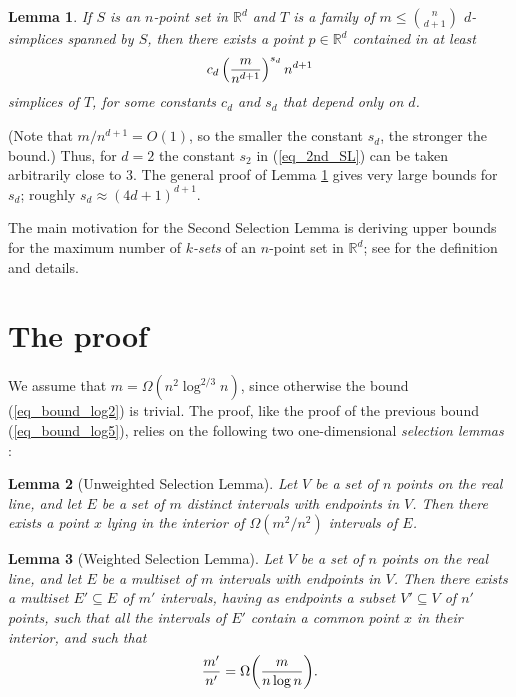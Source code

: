 \documentclass[11pt]{article}
\newtheorem{lemma}{Lemma}
\begin{document}
\begin{lemma}\label{lemma_2nd_sel}
If $S$ is an $n$-point set in $\mathbb R^d$ and $T$ is a family of
$m\le {n \choose d+1}$ $d$-simplices spanned by $S$, then there
exists a point $p\in \mathbb R^d$ contained in at least
\begin{equation}\label{eq_2nd_SL}
c_d \left({ m \over n^{d+1}}\right)^{s_d} n^{d+1}
\end{equation}
simplices of $T$, for some constants $c_d$ and $s_d$ that depend
only on $d$.
\end{lemma}

(Note that $m/n^{d+1} = O(1)$, so the smaller the constant $s_d$,
the stronger the bound.) Thus, for $d=2$ the constant $s_2$ in
(\ref{eq_2nd_SL}) can be taken arbitrarily close to $3$. The general
proof of Lemma \ref{lemma_2nd_sel} gives very large bounds for
$s_d$; roughly $s_d \approx (4d+1)^{d+1}$.

The main motivation for the Second Selection Lemma is deriving upper
bounds for the maximum number of \emph{$k$-sets} of an $n$-point set
in $\mathbb R^d$; see \cite[ch.~11]{matou} for the definition and
details.

\section{The proof}

We assume that $m = \Omega( n^2 \log^{2/3} n)$, since otherwise the
bound (\ref{eq_bound_log2}) is trivial. The proof, like the proof of
the previous bound (\ref{eq_bound_log5}), relies on the following
two one-dimensional \emph{selection lemmas} \cite{ACEGSW}:

\begin{lemma}[Unweighted Selection Lemma]\label{lemma_unw}
Let $V$ be a set of $n$ points on the real line, and let $E$ be a
set of $m$ distinct intervals with endpoints in $V$. Then there
exists a point $x$ lying in the interior of $\Omega(m^2/n^2)$
intervals of $E$.
\end{lemma}

\begin{lemma}[Weighted Selection Lemma]\label{lemma_weighted}
Let $V$ be a set of $n$ points on the real line, and let $E$ be a
\emph{multiset} of $m$ intervals with endpoints in $V$. Then there
exists a multiset $E'\subseteq E$ of $m'$ intervals, having as
endpoints a subset $V' \subseteq V$ of $n'$ points, such that all
the intervals of $E'$ contain a common point $x$ in their interior,
and such that
\begin{equation*}
{m'\over n'}  = \Omega{\left({m\over n\log n}\right)}.
\end{equation*}
\end{lemma}
\end{document}
